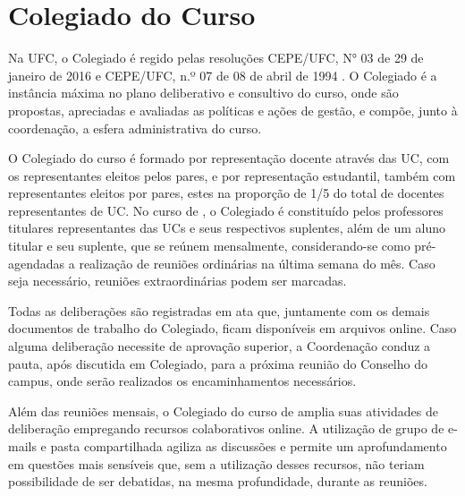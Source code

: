 \section{Colegiado do Curso}

Na UFC, o Colegiado é regido pelas resoluções CEPE/UFC, N° 03 de 29 de janeiro de 2016 \cite{ufc2016resolucao03} e CEPE/UFC, n.º 07 de 08 de abril de 1994 \cite{ufc1994resolucao07}. O Colegiado é a instância máxima no plano deliberativo e consultivo do curso, onde são propostas, apreciadas e avaliadas as políticas e ações de gestão, e compõe, junto à coordenação, a esfera administrativa do curso.

O Colegiado do curso é formado por representação docente através das UC, com os representantes eleitos pelos pares, e por representação estudantil, também com representantes eleitos por pares, estes na proporção de 1/5 do total de docentes representantes de UC. No curso de \nomedocurso, o Colegiado é constituído pelos professores titulares representantes das UCs e seus respectivos suplentes, além de um aluno titular e seu suplente, que se reúnem mensalmente, considerando-se como pré-agendadas a realização de reuniões ordinárias na última semana do mês. Caso seja necessário, reuniões extraordinárias podem ser marcadas. %

Todas as deliberações são registradas em ata que, juntamente com os demais documentos de trabalho do Colegiado, ficam disponíveis em arquivos online. Caso alguma deliberação necessite de aprovação superior, a Coordenação conduz a pauta, após discutida em Colegiado, para a próxima reunião do Conselho do campus, onde serão realizados os encaminhamentos necessários.

Além das reuniões mensais, o Colegiado do curso de \nomedocurso amplia suas atividades de deliberação empregando recursos colaborativos online. A utilização de grupo de e-mails e pasta compartilhada agiliza as discussões e permite um aprofundamento em questões mais sensíveis que, sem a utilização desses recursos, não teriam possibilidade de ser debatidas, na mesma profundidade, durante as reuniões.

